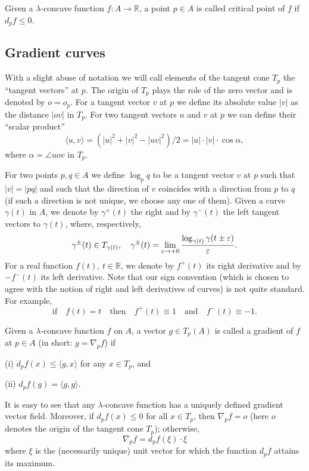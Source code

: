 \documentclass{amsart}
\begin{document}
\begin{defn} Given a $\lambda$-concave function $f\colon A \rightarrow \mathbb{R}$, a point $p\in A$
is called critical point of $f$ if $d_pf\le 0$.
\end{defn}


\subsection{Gradient curves}
With a slight abuse of notation we will call elements of the tangent cone $T_p$ the ``tangent vectors'' at $p$.
The origin of $T_p$ plays the role of the zero
vector and is denoted by $o=o_p$.
For a tangent vector $v$ at $p$ we define its absolute value $|v|$
as the distance $|ov|$ in $T_p$.
For two tangent vectors $u$ and $v$ at $p$ we can define
their ``scalar product''
$$\langle u, v\rangle=(|u|^2+|v|^2-|uv|^2)/2=|u|{\cdot} |v|{\cdot} \cos\alpha,$$ where $\alpha=\angle uov$ in $T_p$.

For two points $p,q\in A$ we define $\log_pq$ to be a tangent vector $v$
at $p$
such that $|v|=|pq|$ and such that the
direction of $v$ coincides with a direction from $p$ to $q$
(if such a direction is not unique, we choose any one of them).
Given a curve $\gamma(t)$ in $A$, we denote by $\gamma^+(t)$
the right and by
$\gamma^-(t)$ the left tangent vectors to  $\gamma(t)$, where, respectively,
$$\gamma^\pm(t)\in T_{\gamma(t)},\quad\gamma^\pm(t)=\lim_{\varepsilon\to +0}\frac{\log_{\gamma(t)}\gamma(t\pm\varepsilon)}{\varepsilon}.$$
For a real function $f(t)$, $t\in \mathbb{R}$, we denote by  $f^+(t)$ its right derivative and by $-f^-(t)$ its left derivative. Note that our sign convention (which is chosen to agree with the notion of right and left derivatives of curves) is not quite standard. For example,
$$\text{if}\quad f(t)=t\quad\text{then}\quad f^+(t)\equiv 1\quad\text{and}\quad f^-(t)\equiv -1.$$


\begin{defn}Given a $\lambda$-concave function $f$ on $A$,
a vector $g\in T_p(A)$ is called a gradient of $f$ at $p\in A$
(in short:  $g=\nabla_p f$) if

(i) $d_pf(x)\le \langle g , x\rangle$ for any $x\in T_p$, and

(ii) $d_pf(g) = \langle g,g \rangle .$
\end{defn}


It is easy to see that any $\lambda$-concave function
has a uniquely defined gradient vector field.
Moreover, if $d_pf(x) \le 0$ for all $x\in T_p$,
then $\nabla_p f=o$
(here $o$ denotes the origin of the tangent cone $T_p$); otherwise,
 $$\nabla_p f=d_pf(\xi){\cdot}  \xi$$
where $\xi$ is the (necessarily unique)
unit vector for which the function $d_pf$ attains its maximum.
\end{document}
